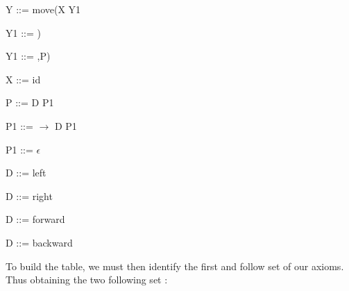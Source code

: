 \documentclass[a4paper, 11pt]{article}
\begin{document}
    \begin{minipage}{\linewidth}
        \begin{enumerate}
        \begin{minipage}{0.45\linewidth}
	           \item Y ::= move(X Y1
               \item Y1 ::= )
               \item Y1 ::= ,P)
               \item X ::= id
               \item P ::= D P1
               \item P1 ::= $\rightarrow$ D P1
        \end{minipage}
        \begin{minipage}{0.45\linewidth}
            \item P1 ::= $\epsilon$
            \item D ::= left
	        \item D ::= right
            \item D ::= forward
            \item D ::= backward
        \end{minipage}
        \end{enumerate}
    \end{minipage}
    \bigskip

	To build the table, we must then identify the first and follow set of our axioms.
	Thus obtaining the two following set :  \newline
\end{document}

